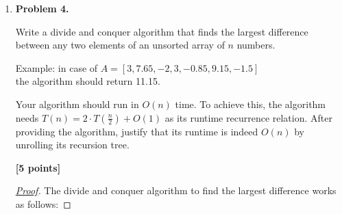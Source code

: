 \documentclass[11pt]{article}
\begin{document}
\begin{enumerate}
\begin{proof}[\underline{Proof}]
\underline{Correctness.} Because each element is at most $k$ positions from its sorted position, the next smallest element must lie within the current $k+1$ candidates in the heap. The \texttt{deleteMin} operation always returns this globally smallest candidate, ensuring elements are placed in the correct sorted order.

\underline{Time Complexity.}
\begin{itemize}
\item Building the initial heap with $k+1$ elements takes $O(k)$.
\item Each \texttt{deleteMin} and \texttt{insert} operation takes $O(\log k)$.
\item There are $n$ \texttt{deleteMin} operations and at most $n$ \texttt{insert} operations.
\end{itemize}
Thus the total running time is

$$
O(k) + O(n \log k) = O(n \log k).
$$

\end{proof}


\item \textbf{Problem 4.}

Write a divide and conquer algorithm that finds the largest difference between any two elements of an unsorted array of \(n\) numbers.

Example: in case of \(A = [3, 7.65, -2, 3, -0.85, 9.15, -1.5]\)\\
the algorithm should return 11.15.

Your algorithm should run in \(O(n)\) time. To achieve this, the algorithm needs \(T(n) = 2 \cdot T (\frac{n}{2}) + O(1)\) as its runtime recurrence relation. After providing the algorithm, justify that its runtime is indeed \(O(n)\) by unrolling its recursion tree.

\begin{flushright}
\textbf{[5 points]}
\end{flushright}

\begin{proof}[\underline{Proof}]

The divide and conquer algorithm to find the largest difference works as follows:


\end{proof}
\end{enumerate}
\end{document}
